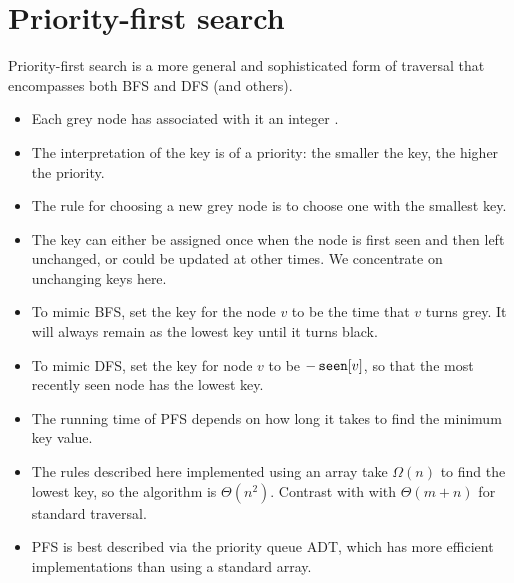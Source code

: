 \section{Priority-first search} \label{sec:PFS}
Priority-first search is a more general and sophisticated form of traversal that encompasses both BFS and DFS (and others). 

\begin{itemize}
	\item Each grey node has associated with it an integer . 
	\item The interpretation of the key is of a priority: 
	the smaller the key, the higher the priority. 
	\item The rule for choosing a new grey node is to choose one with the smallest key.  
	\item The key can either be assigned once when the node is first seen and then left unchanged, 
	or could be updated at other times. We concentrate on unchanging keys here.
	\item To mimic BFS, set the key for the node $v$ to be the time that $v$ turns grey. 
	It will always remain as the lowest key until it turns black.
	\item To mimic DFS, set the key for node $v$ to be $-\operatorname{\text{\texttt{seen}}}[v]$, 
	so that the most recently seen node has the lowest key.
	\item The running time of PFS depends on how long it takes to find the minimum key value.
	\item The rules described here implemented using an array take $\Omega(n)$ to find the lowest key, 
	so the algorithm is $\Theta(n^2)$. Contrast with with $\Theta(m+n)$ for standard traversal.
	\item PFS is best described via the priority queue ADT, 
	which has more efficient implementations than using a standard array.
\end{itemize}

